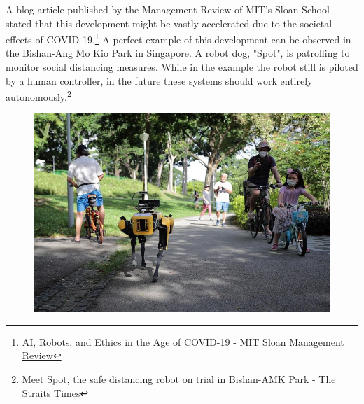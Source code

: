 A blog article published by the Management Review of MIT's Sloan School stated that this development might be vastly accelerated due to the societal effects of COVID-19.\footnote{\href{https://sloanreview.mit.edu/article/ai-robots-and-ethics-in-the-age-of-covid-19/}{AI, Robots, and Ethics in the Age of COVID-19 - MIT Sloan Management Review}} A perfect example of this development can be observed in the Bishan-Ang Mo Kio Park in Singapore. A robot dog, "Spot", is patrolling to monitor social distancing measures. While in the example the robot still is piloted by a human controller, in the future these systems should work entirely autonomously.\footnote{\href{http://www.straitstimes.com/singapore/meet-spot-the-safe-distancing-robot-on-trial-in-bishan-amk-park}{Meet Spot, the safe distancing robot on trial in Bishan-AMK Park - The Straits Times}}

\begin{figure}[!ht]
\begin{center}
\includegraphics[width=\imgwidth]{images/spot.jpg}
\label{img:spot_in_park}
\end{center}
\end{figure}

